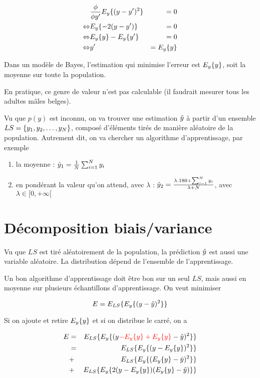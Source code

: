 	\begin{eqnarray*}
	 & \frac{\phi}{\phi y'} E_y\{(y - y')^2\} & = 0 \\
	\Leftrightarrow & E_y\{-2(y - y')\} & = 0 \\
	\Leftrightarrow & E_y\{y\} - E_y\{y'\} & = 0 \\
	\Leftrightarrow & y' & = E_y\{y\}
	\end{eqnarray*}
	
	Dans un modèle de Bayes, l'estimation qui minimise l'erreur est $E_y\{y\}$, soit la moyenne sur toute la population.
	
	En pratique, ce genre de valeur n'est pas calculable (il faudrait mesurer tous les adultes mâles belges).
	
	Vu que $p(y)$ est inconnu, on va trouver une estimation $\hat{y}$ à partir d'un ensemble $LS = \lbrace y_1, y_2, \dots , y_N \rbrace$, composé d'éléments tirés de manière aléatoire de la population. Autrement dit, on va chercher un algorithme d'apprentissage, par exemple
	
	\begin{enumerate}
		\item la moyenne : $\hat{y}_1 = \frac{1}{N} \sum_{i = 1}^N y_i$
		\item en pondérant la valeur qu'on attend, avec $\lambda$ : $\hat{y}_2 = \frac{\lambda . 180 + \sum_{i = 1}^N y_i}{\lambda + N}$, avec $\lambda \in [ 0, +\infty [ $
	\end{enumerate}
	
	\section{Décomposition biais/variance}
	
	Vu que $LS$ est tiré aléatoirement de la population, la prédiction $\hat{y}$ est aussi une variable aléatoire. La distribution dépend de l'ensemble de l'apprentissage.
	
	
	Un bon algorithme d'apprentissage doit être bon sur un seul $LS$, mais aussi en moyenne sur plusieurs échantillons d'apprentissage. On veut minimiser 
	
	$$E = E_{LS}\{E_y\{(y - \hat{y})^2\}\}$$
	
	Si on ajoute et retire $E_y\{y\}$ et si on distribue le carré, on a
	
	\begin{eqnarray*}
  	E & = & E_{LS}\{E_y\{(y \textcolor{red}{- E_y\{y\} + E_y\{y\}} - \hat{y})^2\}\} \\
  	 & = & E_{LS}\{E_y\{(y - E_y\{y\})^2\}\} \\
  	 & + & E_{LS}\{E_y\{(E_y\{y\} - \hat{y})^2\}\} \\
  	 & + & E_{LS}\{E_y\{2(y - E_y\{y\})(E_y\{y\} - \hat{y})\}\}
	\end{eqnarray*}

